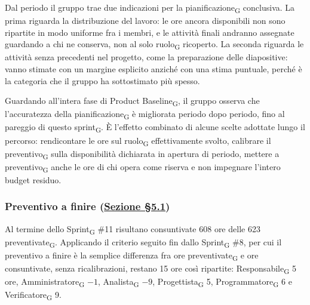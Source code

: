 ﻿\documentclass[a4paper, 10pt, colorlinks=true, linkcolor=black, urlcolor=blue, citecolor=blue, hidelinks]{article}
\begin{document}
Dal periodo il gruppo trae due indicazioni per la pianificazione\textsubscript{G} conclusiva. La prima riguarda la distribuzione del lavoro: le ore ancora disponibili non sono ripartite in modo uniforme fra i membri, e le attività finali andranno assegnate guardando a chi ne conserva, non al solo ruolo\textsubscript{G} ricoperto. La seconda riguarda le attività senza precedenti nel progetto, come la preparazione delle diapositive: vanno stimate con un margine esplicito anziché con una stima puntuale, perché è la categoria che il gruppo ha sottostimato più spesso.

Guardando all'intera fase di Product Baseline\textsubscript{G}, il gruppo osserva che l'accuratezza della pianificazione\textsubscript{G} è migliorata periodo dopo periodo, fino al pareggio di questo sprint\textsubscript{G}. È l'effetto combinato di alcune scelte adottate lungo il percorso: rendicontare le ore sul ruolo\textsubscript{G} effettivamente svolto, calibrare il preventivo\textsubscript{G} sulla disponibilità dichiarata in apertura di periodo, mettere a preventivo\textsubscript{G} anche le ore di chi opera come riserva e non impegnare l'intero budget residuo.

\subsubsection{Preventivo a finire (\hyperref[tab:preventivo-finire]{Sezione \S5.1})}
Al termine dello Sprint\textsubscript{G} \#11 risultano consuntivate 608 ore delle 623 preventivate\textsubscript{G}. Applicando il criterio seguito fin dallo Sprint\textsubscript{G} \#8, per cui il preventivo a finire è la semplice differenza fra ore preventivate\textsubscript{G} e ore consuntivate, senza ricalibrazioni, restano 15 ore così ripartite: Responsabile\textsubscript{G} 5 ore, Amministratore\textsubscript{G} $-1$, Analista\textsubscript{G} $-9$, Progettista\textsubscript{G} 5, Programmatore\textsubscript{G} 6 e Verificatore\textsubscript{G} 9.
\end{document}
